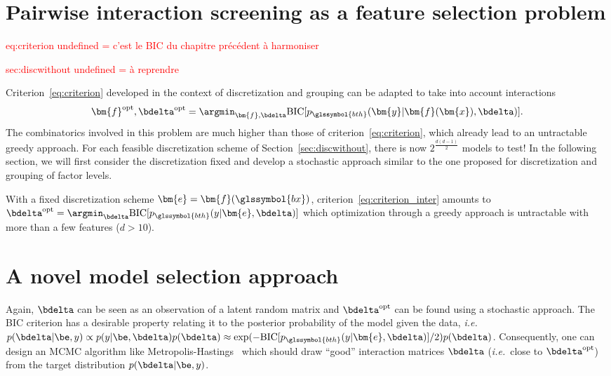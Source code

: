 \section{Pairwise interaction screening as a feature selection problem}

\textcolor{red}{eq:criterion undefined = c'est le BIC du chapitre précédent à harmoniser}

\textcolor{red}{sec:discwithout undefined = à reprendre}

Criterion~\eqref{eq:criterion} developed in the context of discretization and grouping can be adapted to take into account interactions
\begin{equation}\label{eq:criterion_inter}
\bm{f}^{\text{opt}},\bdelta^{\text{opt}} = \argmin_{\bm{f},\bdelta} \text{BIC}[p_{\glssymbol{bth}}(\bm{y}|\bm{f}(\bm{x}),\bdelta)].
\end{equation}
The combinatorics involved in this problem are much higher than those of criterion~\eqref{eq:criterion}, which already lead to an untractable greedy approach. For each feasible discretization scheme of Section~\ref{sec:discwithout}, there is now $2^{\frac{d(d-1)}{2}}$ models to test! In the following section, we will first consider the discretization fixed and develop a stochastic approach similar to the one proposed for discretization and grouping of factor levels.

With a fixed discretization scheme $\bm{e} = \bm{f}(\glssymbol{bx})$, criterion~\ref{eq:criterion_inter} amounts to $\bdelta^{\text{opt}} = \argmin_{\bdelta} \text{BIC}[p_{\glssymbol{bth}}(y|\bm{e},\bdelta)]$ which optimization through a greedy approach is untractable with more than a few features ($d > 10$).

\section{A novel model selection approach}







Again, $\bdelta$ can be seen as an observation of a latent random matrix and $\bdelta^{\text{opt}}$ can be found using a stochastic approach. The BIC criterion has a desirable property relating it to the posterior probability of the model given the data, \textit{i.e.}\ $p(\bdelta | \be, y) \propto p(y | \be, \bdelta) p(\bdelta) \approx \exp(-\text{BIC}[p_{\glssymbol{bth}}(y|\bm{e},\bdelta)]/2)  p(\bdelta)$. Consequently, one can design an MCMC algorithm like Metropolis-Hastings~\cite{hastings1970monte} which should draw ``good'' interaction matrices $\bdelta$ (\textit{i.e.}\ close to $\bdelta^{\text{opt}}$) from the target distribution $p(\bdelta | \be, y)$.

